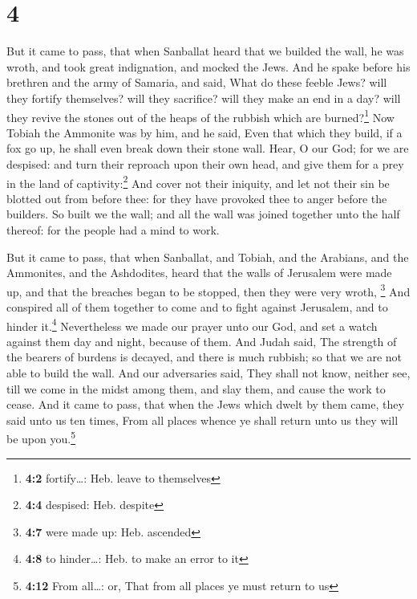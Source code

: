 \hypertarget{section-3}{%
\section{4}\label{section-3}}

 But it came to pass, that when Sanballat heard that we
builded the wall, he was wroth, and took great indignation, and mocked
the Jews.  And he spake before his brethren and the army
of Samaria, and said, What do these feeble Jews? will they fortify
themselves? will they sacrifice? will they make an end in a day? will
they revive the stones out of the heaps of the rubbish which are
burned?\footnote{\textbf{4:2} fortify\ldots: Heb. leave to themselves}
 Now Tobiah the Ammonite was by him, and he said, Even
that which they build, if a fox go up, he shall even break down their
stone wall.  Hear, O our God; for we are despised: and
turn their reproach upon their own head, and give them for a prey in the
land of captivity:\footnote{\textbf{4:4} despised: Heb. despite}
 And cover not their iniquity, and let not their sin be
blotted out from before thee: for they have provoked thee to anger
before the builders.  So built we the wall; and all the
wall was joined together unto the half thereof: for the people had a
mind to work.

 But it came to pass, that when Sanballat, and Tobiah, and
the Arabians, and the Ammonites, and the Ashdodites, heard that the
walls of Jerusalem were made up, and that the breaches began to be
stopped, then they were very wroth, \footnote{\textbf{4:7} were made up:
  Heb. ascended}  And conspired all of them together to
come and to fight against Jerusalem, and to hinder it.\footnote{\textbf{4:8}
  to hinder\ldots: Heb. to make an error to it} 
Nevertheless we made our prayer unto our God, and set a watch against
them day and night, because of them.  And Judah said, The
strength of the bearers of burdens is decayed, and there is much
rubbish; so that we are not able to build the wall.  And
our adversaries said, They shall not know, neither see, till we come in
the midst among them, and slay them, and cause the work to cease.
 And it came to pass, that when the Jews which dwelt by
them came, they said unto us ten times, From all places whence ye shall
return unto us they will be upon you.\footnote{\textbf{4:12} From
  all\ldots: or, That from all places ye must return to us}

